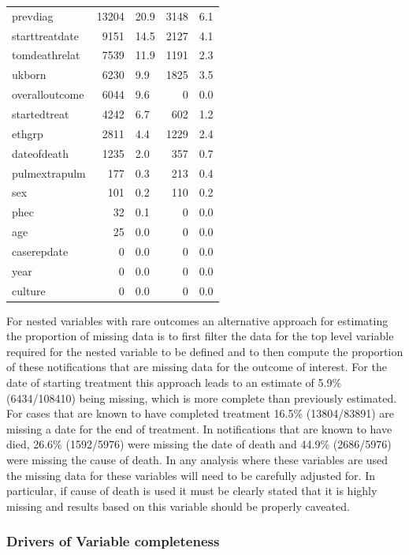 \documentclass[11pt,twoside]{bristolthesis}
\begin{document}
\begin{table}[H]
\begin{tabular}{lrlrl}
  \addlinespace
  prevdiag & 13204 & 20.9 & 3148 & 6.1\\
  starttreatdate & 9151 & 14.5 & 2127 & 4.1\\
  tomdeathrelat & 7539 & 11.9 & 1191 & 2.3\\
  ukborn & 6230 & 9.9 & 1825 & 3.5\\
  overalloutcome & 6044 & 9.6 & 0 & 0.0\\
  \addlinespace
  startedtreat & 4242 & 6.7 & 602 & 1.2\\
  ethgrp & 2811 & 4.4 & 1229 & 2.4\\
  dateofdeath & 1235 & 2.0 & 357 & 0.7\\
  pulmextrapulm & 177 & 0.3 & 213 & 0.4\\
  sex & 101 & 0.2 & 110 & 0.2\\
  \addlinespace
  phec & 32 & 0.1 & 0 & 0.0\\
  age & 25 & 0.0 & 0 & 0.0\\
  caserepdate & 0 & 0.0 & 0 & 0.0\\
  year & 0 & 0.0 & 0 & 0.0\\
  culture & 0 & 0.0 & 0 & 0.0\\
  \bottomrule
  \end{tabular}
  \end{table}
  For nested variables with rare outcomes an alternative approach for estimating the proportion of missing data is to first filter the data for the top level variable required for the nested variable to be defined and to then compute the proportion of these notifications that are missing data for the outcome of interest. For the date of starting treatment this approach leads to an estimate of 5.9\% (6434/108410) being missing, which is more complete than previously estimated. For cases that are known to have completed treatment 16.5\% (13804/83891) are missing a date for the end of treatment. In notifications that are known to have died, 26.6\% (1592/5976) were missing the date of death and 44.9\% (2686/5976) were missing the cause of death. In any analysis where these variables are used the missing data for these variables will need to be carefully adjusted for. In particular, if cause of death is used it must be clearly stated that it is highly missing and results based on this variable should be properly caveated.
  
  \hypertarget{drivers-of-variable-completeness}{%
  \subsubsection{Drivers of Variable completeness}\label{drivers-of-variable-completeness}}
  
\end{document}
